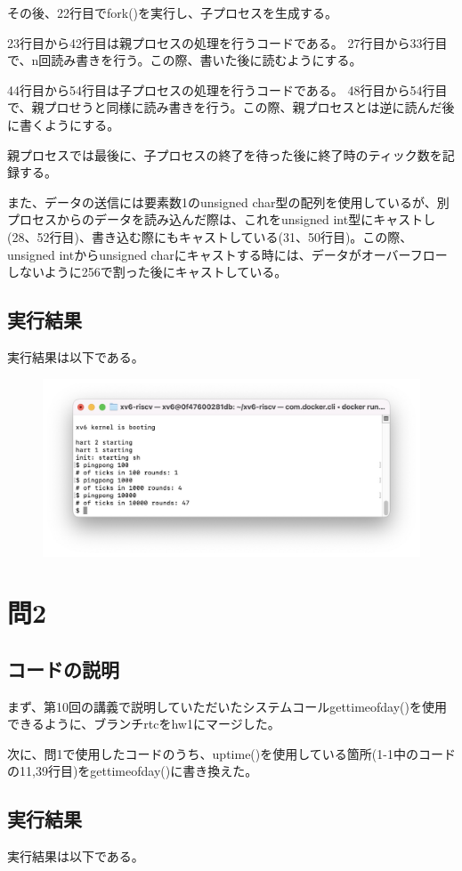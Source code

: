 \documentclass[11pt,a4paper]{jsarticle}
\begin{document}
その後、22行目でfork()を実行し、子プロセスを生成する。

23行目から42行目は親プロセスの処理を行うコードである。
27行目から33行目で、n回読み書きを行う。この際、書いた後に読むようにする。

44行目から54行目は子プロセスの処理を行うコードである。
48行目から54行目で、親プロせうと同様に読み書きを行う。この際、親プロセスとは逆に読んだ後に書くようにする。

親プロセスでは最後に、子プロセスの終了を待った後に終了時のティック数を記録する。

また、データの送信には要素数1のunsigned char型の配列を使用しているが、別プロセスからのデータを読み込んだ際は、これをunsigned int型にキャストし(28、52行目)、書き込む際にもキャストしている(31、50行目)。この際、unsigned intからunsigned charにキャストする時には、データがオーバーフローしないように256で割った後にキャストしている。


\subsection{実行結果}
実行結果は以下である。

\begin{figure}[H]
\includegraphics[width=0.8\linewidth]{image/figure1.png}
\end{figure}

\section{問2}
\subsection{コードの説明}
まず、第10回の講義で説明していただいたシステムコールgettimeofday()を使用できるように、ブランチrtcをhw1にマージした。

次に、問1で使用したコードのうち、uptime()を使用している箇所(1-1中のコードの11,39行目)をgettimeofday()に書き換えた。

\subsection{実行結果}
実行結果は以下である。
\end{document}
